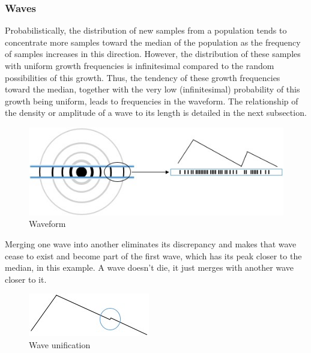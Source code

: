 \subsubsection{Waves}
Probabilistically, the distribution of new samples from a population tends to concentrate more samples toward the median of the population as the frequency of samples increases in this direction. However, the distribution of these samples with uniform growth frequencies is infinitesimal compared to the random possibilities of this growth. Thus, the tendency of these growth frequencies toward the median, together with the very low (infinitesimal) probability of this growth being uniform, leads to frequencies in the waveform. The relationship of the density or amplitude of a wave to its length is detailed in the next subsection.
	\begin{figure}[H]
	\caption{Waveform}
	\label{fig:consciousness_waves}
	\centering
	\includegraphics[scale=.8]{sections/images/consciousness_waves.jpg}
	\end{figure}

Merging one wave into another eliminates its discrepancy and makes that wave cease to exist and become part of the first wave, which has its peak closer to the median, in this example. A wave doesn't die, it just merges with another wave closer to it.
	\begin{figure}[H]
	\caption{Wave unification}
	\label{fig:consciousness_uniform_wave}
	\centering
	\includegraphics[scale=1]{sections/images/consciousness_uniform_wave.jpg}
	\end{figure}

